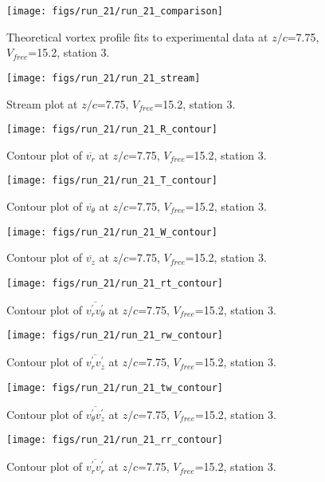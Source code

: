 \begin{figure}[H]
\centering
\texttt{[image: figs/run\_21/run\_21\_comparison]}
\caption{Theoretical vortex profile fits to experimental data at $z/c$=7.75, $V_{free}$=15.2, station 3.}
\end{figure}


\begin{figure}[H]
\centering
\texttt{[image: figs/run\_21/run\_21\_stream]}
\caption{Stream plot at $z/c$=7.75, $V_{free}$=15.2, station 3.}
\end{figure}


\begin{figure}[H]
\centering
\texttt{[image: figs/run\_21/run\_21\_R\_contour]}
\caption{Contour plot of $\overline{v_{r}}$ at $z/c$=7.75, $V_{free}$=15.2, station 3.}
\end{figure}


\begin{figure}[H]
\centering
\texttt{[image: figs/run\_21/run\_21\_T\_contour]}
\caption{Contour plot of $\overline{v_{\theta}}$ at $z/c$=7.75, $V_{free}$=15.2, station 3.}
\end{figure}


\begin{figure}[H]
\centering
\texttt{[image: figs/run\_21/run\_21\_W\_contour]}
\caption{Contour plot of $\overline{v_{z}}$ at $z/c$=7.75, $V_{free}$=15.2, station 3.}
\end{figure}


\begin{figure}[H]
\centering
\texttt{[image: figs/run\_21/run\_21\_rt\_contour]}
\caption{Contour plot of $\overline{v_{r}^{\prime} v_{\theta}^{\prime}}$ at $z/c$=7.75, $V_{free}$=15.2, station 3.}
\end{figure}


\begin{figure}[H]
\centering
\texttt{[image: figs/run\_21/run\_21\_rw\_contour]}
\caption{Contour plot of $\overline{v_{r}^{\prime} v_{z}^{\prime}}$ at $z/c$=7.75, $V_{free}$=15.2, station 3.}
\end{figure}


\begin{figure}[H]
\centering
\texttt{[image: figs/run\_21/run\_21\_tw\_contour]}
\caption{Contour plot of $\overline{v_{\theta}^{\prime} v_{z}^{\prime}}$ at $z/c$=7.75, $V_{free}$=15.2, station 3.}
\end{figure}


\begin{figure}[H]
\centering
\texttt{[image: figs/run\_21/run\_21\_rr\_contour]}
\caption{Contour plot of $\overline{v_{r}^{\prime} v_{r}^{\prime}}$ at $z/c$=7.75, $V_{free}$=15.2, station 3.}
\end{figure}


